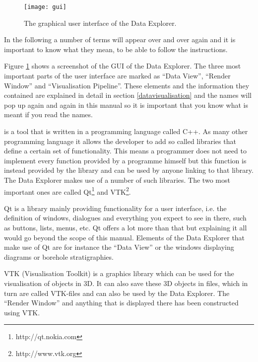 \begin{figure}[tb]
\begin{center}
\texttt{[image: gui]}
\caption{The graphical user interface of the \ogs Data Explorer.}
\label{fig:gui}
\end{center}
\end{figure}

In the following a number of terms will appear over and over again and it is important to know what they mean, to be able to follow the instructions.

Figure \ref{fig:gui} shows a screenshot of the GUI of the \ogs Data Explorer. The three most important parts of the user interface are marked as ``Data View'', ``Render Window'' and ``Visualisation Pipeline''. These elements and the information they contained are explained in detail in section \ref{datavisualisation} and the names will pop up again and again in this manual so it is important that you know what is meant if you read the names.

\ogs is a tool that is written in a programming language called C++. As many other programming language it allows the developer to add so called libraries that define a certain set of functionality. This means a programmer does not need to implement every function provided by a programme himself but this function is instead provided by the library and can be used by anyone linking to that library. The Data Explorer makes use of a number of such libraries. The two most important ones are called Qt\footnote{http://qt.nokia.com} and VTK\footnote{http://www.vtk.org}.

Qt is a library mainly providing functionality for a user interface, i.e. the definition of windows, dialogues and everything you expect to see in there, such as buttons, lists, menus, etc. Qt offers a lot more than that but explaining it all would go beyond the scope of this manual. Elements of the Data Explorer that make use of Qt are for instance the ``Data View'' or the windows displaying diagrams or borehole stratigraphies.

VTK (Visualisation Toolkit) is a graphics library which can be used for the visualisation of objects in 3D. It can also save these 3D objects in files, which in turn are called VTK-files and can also be used by the Data Explorer. The ``Render Window'' and anything that is displayed there has been constructed using VTK.

